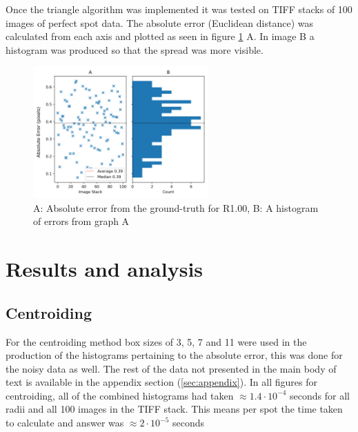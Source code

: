 \documentclass[aps,pra,a4paper,nofootinbib,onecolumn,tightenlines,longbibliography,12pt,amsfonts,amssymb,amsmath,floatfix]{revtex4-2} %
\begin{document}
    Once the triangle algorithm was implemented it was tested on TIFF stacks of 100 images 
    of perfect spot data. The absolute error (Euclidean distance) was calculated from each 
    axis and plotted as seen in figure \ref{fig:single_histo} A. In image B a histogram 
    was produced so that the spread was more visible.

    \begin{figure}[H]
    \begin{center}
      \includegraphics[width=0.6\textwidth]{project_pics/single_histo.png}
    \end{center}
    \caption{A: Absolute error from the ground-truth for R1.00, B: A histogram of errors from graph A}
    \label{fig:single_histo}
  \end{figure}
    
    

\section{Results and analysis} %
\label{sec:Results}

  \subsection{Centroiding} %
  \label{sub:Centroiding_results}

  For the centroiding method box sizes of 3, 5, 7 and 11 were used in the production 
  of the histograms pertaining to the absolute error, this was done for the noisy data as 
  well. The rest of the data not presented in the main body of text is available in the appendix 
  section (\ref{sec:appendix}). In all figures for centroiding, all of the combined histograms had 
  taken $\approx 1.4\cdot 10^{-4}$ seconds for all radii and all 100 images in the TIFF stack. This means per 
  spot the time taken to calculate and answer was $\approx 2\cdot 10^{-5}$ seconds
\end{document}
